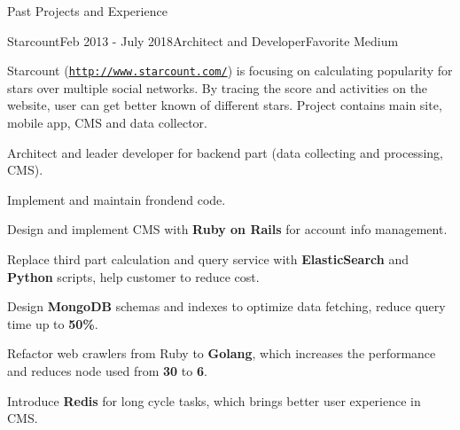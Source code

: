 \documentclass{resume} %
\newcommand{\http}{http:/\hspace{-0.3ex}/}
\begin{document}
\begin{rSection}{Past Projects and Experience}
\begin{rSubsection}{Starcount}{Feb 2013 - July 2018}{Architect and Developer}{Favorite Medium}

Starcount (\href{http://www.starcount.com/}{\tt \http{}www.starcount.com/}) is focusing on calculating popularity for stars over multiple social networks. By tracing the score and activities on the website, user can get better known of different stars. Project contains main site, mobile app, CMS and data collector.

\begin{rSubsectionList}
\item Architect and leader developer for backend part (data collecting and processing, CMS).
\item Implement and maintain frondend code.
\item Design and implement CMS with \textbf{Ruby on Rails} for account info management.
\item Replace third part calculation and query service with \textbf{ElasticSearch} and \textbf{Python} scripts, help customer to reduce cost.
\item Design \textbf{MongoDB} schemas and indexes to optimize data fetching, reduce query time up to \textbf{50\%}.
\item Refactor web crawlers from Ruby to \textbf{Golang}, which increases the performance and reduces node used from \textbf{30} to \textbf{6}.
\item Introduce \textbf{Redis} for long cycle tasks, which brings better user experience in CMS.
\end{rSubsectionList}
\end{rSubsection}


%
%



\end{rSection}
\end{document}
